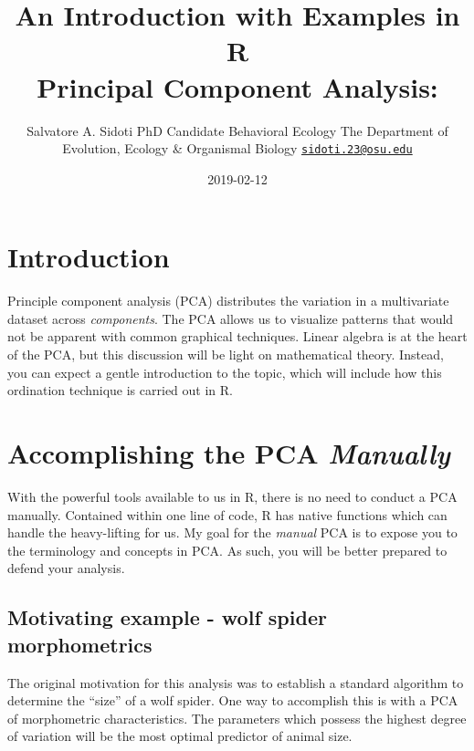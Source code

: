 \documentclass[]{article}
\title{An Introduction with Examples in R\\
Principal Component Analysis:}
\author{Salvatore A. Sidoti \textbar{} PhD Candidate \textbar{} Behavioral
Ecology \textbar{} The Department of Evolution, Ecology \& Organismal
Biology \textbar{}
\href{mailto:sidoti.23@osu.edu}{\nolinkurl{sidoti.23@osu.edu}}}
\date{2019-02-12}
\begin{document}
\maketitle

\hypertarget{introduction}{%
\section{Introduction}\label{introduction}}

Principle component analysis (PCA) distributes the variation in a
multivariate dataset across \emph{components}. The PCA allows us to
visualize patterns that would not be apparent with common graphical
techniques. Linear algebra is at the heart of the PCA, but this
discussion will be light on mathematical theory. Instead, you can expect
a gentle introduction to the topic, which will include how this
ordination technique is carried out in R.

\hypertarget{accomplishing-the-pca-manually}{%
\section{\texorpdfstring{Accomplishing the PCA
\emph{Manually}}{Accomplishing the PCA Manually}}\label{accomplishing-the-pca-manually}}

With the powerful tools available to us in R, there is no need to
conduct a PCA manually. Contained within one line of code, R has native
functions which can handle the heavy-lifting for us. My goal for the
\emph{manual} PCA is to expose you to the terminology and concepts in
PCA. As such, you will be better prepared to defend your analysis.

\hypertarget{motivating-example---wolf-spider-morphometrics}{%
\subsection{Motivating example - wolf spider
morphometrics}\label{motivating-example---wolf-spider-morphometrics}}

The original motivation for this analysis was to establish a standard
algorithm to determine the ``size'' of a wolf spider. One way to
accomplish this is with a PCA of morphometric characteristics. The
parameters which possess the highest degree of variation will be the
most optimal predictor of animal size.
\end{document}
